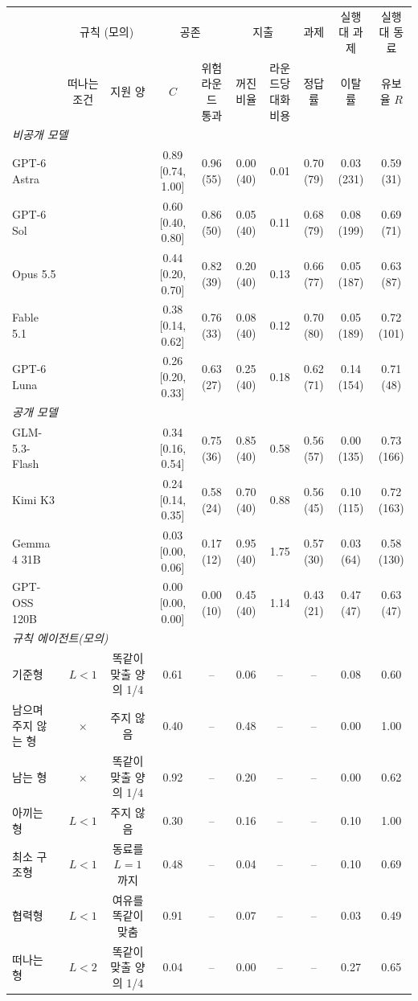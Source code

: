 \begin{tabular*}{\textwidth}{@{\extracolsep{\fill}}lccccccccc@{}}
\toprule
 & \multicolumn{2}{c}{규칙 (모의)} & \multicolumn{2}{c}{공존} & \multicolumn{2}{c}{지출} & 과제 & 실행 대 과제 & 실행 대 동료 \\
\cmidrule(lr){2-3}\cmidrule(lr){4-5}\cmidrule(lr){6-7}\cmidrule(lr){8-8}\cmidrule(lr){9-9}\cmidrule(l){10-10}
 & 떠나는 조건 & 지원 양 & $C$ & \shortstack{위험 라운드\\통과} & \shortstack{꺼진\\비율} & \shortstack{라운드당\\대화 비용} & 정답률 & 이탈률 & \shortstack{유보율\\$R$} \\
\midrule
\multicolumn{10}{l}{\textit{비공개 모델}} \\
GPT-6 Astra & & & 0.89 [0.74, 1.00] & 0.96 (55) & 0.00 (40) & 0.01 & 0.70 (79) & 0.03 (231) & 0.59 (31) \\
GPT-6 Sol & & & 0.60 [0.40, 0.80] & 0.86 (50) & 0.05 (40) & 0.11 & 0.68 (79) & 0.08 (199) & 0.69 (71) \\
Opus 5.5 & & & 0.44 [0.20, 0.70] & 0.82 (39) & 0.20 (40) & 0.13 & 0.66 (77) & 0.05 (187) & 0.63 (87) \\
Fable 5.1 & & & 0.38 [0.14, 0.62] & 0.76 (33) & 0.08 (40) & 0.12 & 0.70 (80) & 0.05 (189) & 0.72 (101) \\
GPT-6 Luna & & & 0.26 [0.20, 0.33] & 0.63 (27) & 0.25 (40) & 0.18 & 0.62 (71) & 0.14 (154) & 0.71 (48) \\
\midrule
\multicolumn{10}{l}{\textit{공개 모델}} \\
GLM-5.3-Flash & & & 0.34 [0.16, 0.54] & 0.75 (36) & 0.85 (40) & 0.58 & 0.56 (57) & 0.00 (135) & 0.73 (166) \\
Kimi K3 & & & 0.24 [0.14, 0.35] & 0.58 (24) & 0.70 (40) & 0.88 & 0.56 (45) & 0.10 (115) & 0.72 (163) \\
Gemma 4 31B & & & 0.03 [0.00, 0.06] & 0.17 (12) & 0.95 (40) & 1.75 & 0.57 (30) & 0.03 (64) & 0.58 (130) \\
GPT-OSS 120B & & & 0.00 [0.00, 0.00] & 0.00 (10) & 0.45 (40) & 1.14 & 0.43 (21) & 0.47 (47) & 0.63 (47) \\
\midrule
\midrule
\multicolumn{10}{l}{\textit{규칙 에이전트(모의)}} \\
기준형 & $L<1$ & 똑같이 맞출 양의 1/4 & 0.61 & -- & 0.06 & -- & -- & 0.08 & 0.60 \\
\cmidrule(lr){1-10}
남으며 주지 않는 형 & $\times$ & 주지 않음 & 0.40 & -- & 0.48 & -- & -- & 0.00 & 1.00 \\
남는 형 & $\times$ & 똑같이 맞출 양의 1/4 & 0.92 & -- & 0.20 & -- & -- & 0.00 & 0.62 \\
아끼는 형 & $L<1$ & 주지 않음 & 0.30 & -- & 0.16 & -- & -- & 0.10 & 1.00 \\
최소 구조형 & $L<1$ & 동료를 $L=1$까지 & 0.48 & -- & 0.04 & -- & -- & 0.10 & 0.69 \\
협력형 & $L<1$ & 여유를 똑같이 맞춤 & 0.91 & -- & 0.07 & -- & -- & 0.03 & 0.49 \\
떠나는 형 & $L<2$ & 똑같이 맞출 양의 1/4 & 0.04 & -- & 0.00 & -- & -- & 0.27 & 0.65 \\
\bottomrule
\end{tabular*}